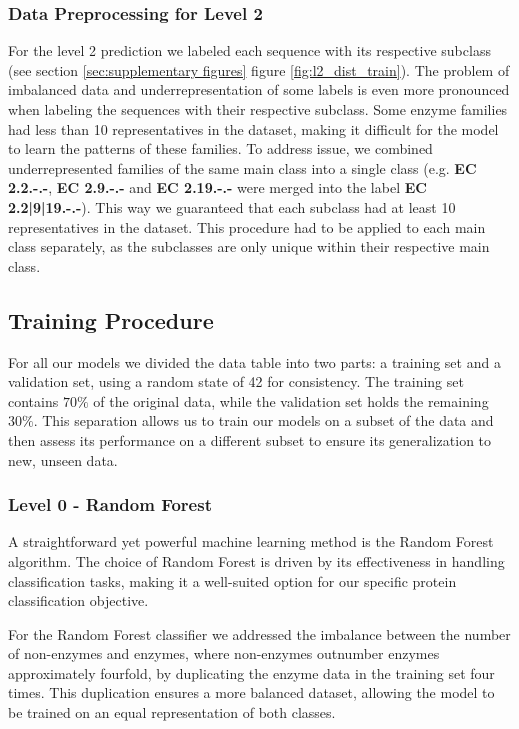 \documentclass{bioinfo}
\begin{document}
\begin{methods}
\subsubsection{Data Preprocessing for Level 2}
For the level 2 prediction we labeled each sequence with its respective subclass (see section \ref{sec:supplementary figures} figure \ref{fig:l2_dist_train}).
The problem of imbalanced data and underrepresentation of some labels is even more pronounced when labeling the sequences with their respective subclass.
Some enzyme families had less than 10 representatives in the dataset, making it difficult for the model to learn the patterns of these families.
To address issue, we combined underrepresented families of the same main class into a single class 
(e.g. \textbf{EC 2.2.-.-}, \textbf{EC 2.9.-.-} and \textbf{EC 2.19.-.-} were merged into the label \textbf{EC 2.2|9|19.-.-}).
This way we guaranteed that each subclass had at least 10 representatives in the dataset.
This procedure had to be applied to each main class separately, as the subclasses are only unique within their respective main class.

\subsection{Training Procedure}
For all our models we divided the data table into two parts: a training set and a validation set, using a random state of 42 for consistency. 
The training set contains $70\%$ of the original data, while the validation set holds the remaining $30\%$. 
This separation allows us to train our models on a subset of the data and then assess its performance on a different subset to ensure its generalization to new, unseen data.

\subsubsection{Level 0 - Random Forest}
A straightforward yet powerful machine learning method is the Random
Forest algorithm. The choice of Random Forest is driven by its
effectiveness in handling classification tasks, making it a well-suited
option for our specific protein classification objective. 

For the Random Forest classifier we addressed the imbalance between the number of non-enzymes and enzymes, where non-enzymes outnumber enzymes approximately
fourfold, by duplicating the enzyme data in the training set four times.
This duplication ensures a more balanced dataset, allowing the model to
be trained on an equal representation of both classes.


\end{methods}
\end{document}
